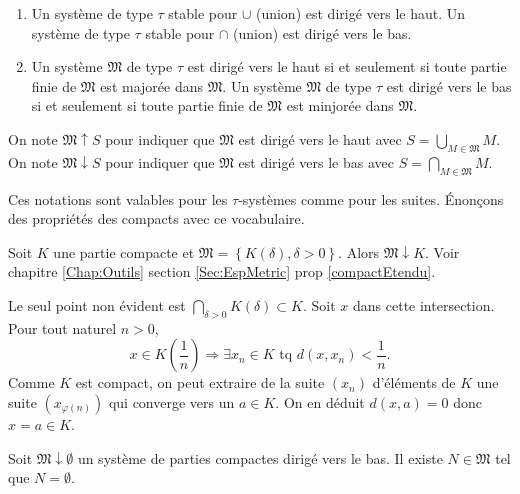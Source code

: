 \begin{rems}
 \begin{enumerate}
  \item Un système de type $\tau$ stable pour $\cup$ (union) est dirigé vers le haut. Un système de type $\tau$ stable pour $\cap$ (union) est dirigé vers le bas.
  \item Un système $\mathfrak{M}$ de type $\tau$ est dirigé vers le haut si et seulement si toute partie finie de $\mathfrak{M}$ est majorée dans $\mathfrak{M}$. Un système $\mathfrak{M}$ de type $\tau$ est dirigé vers le bas si et seulement si toute partie finie de $\mathfrak{M}$ est minjorée dans $\mathfrak{M}$.
 \end{enumerate}
\end{rems}
\begin{defin}\label{Def:limMonotone}
  On note $\mathfrak{M}\uparrow S$ pour indiquer que $\mathfrak{M}$ est dirigé vers le haut avec $S = \bigcup_{M \in \mathfrak{M}}M$.\newline
  On note $\mathfrak{M}\downarrow S$ pour indiquer que $\mathfrak{M}$ est dirigé vers le bas avec $S = \bigcap_{M \in \mathfrak{M}}M$.
\end{defin}
\noindent Ces notations sont valables pour les $\tau$-systèmes comme pour les suites. Énonçons des propriétés des compacts avec ce vocabulaire.
\begin{exple} \label{systAproxCompact}
 Soit $K$ une partie compacte et $\mathfrak{M} = \left\lbrace K(\delta), \delta >0  \right\rbrace$. Alors $\mathfrak{M} \downarrow K$. Voir chapitre \ref{Chap:Outils} section \ref{Sec:EspMetric} prop  \ref{compactEtendu}.
\end{exple}
\begin{demo}
 Le seul point non évident est $\bigcap_{\delta > 0} K(\delta) \subset K$. Soit $x$ dans cette intersection. Pour tout naturel $n>0$,
 \begin{displaymath}
  x \in K(\frac{1}{n}) \Rightarrow \exists x_n \in K \text{ tq } d(x,x_n) < \frac{1}{n}.
 \end{displaymath}
Comme $K$ est compact, on peut extraire de la suite $(x_n)$ d'éléments de $K$ une suite $(x_{\varphi(n)})$ qui converge vers un $a\in K$. On en déduit $d(x,a)=0$ donc $x=a \in K$.
\end{demo}
\begin{propn}\label{Prop:SegEmboit}
 Soit $\mathfrak{M}\downarrow \emptyset$ un système de parties compactes dirigé vers le bas. Il existe $N \in \mathfrak{M}$ tel que $N = \emptyset$.
\end{propn}
